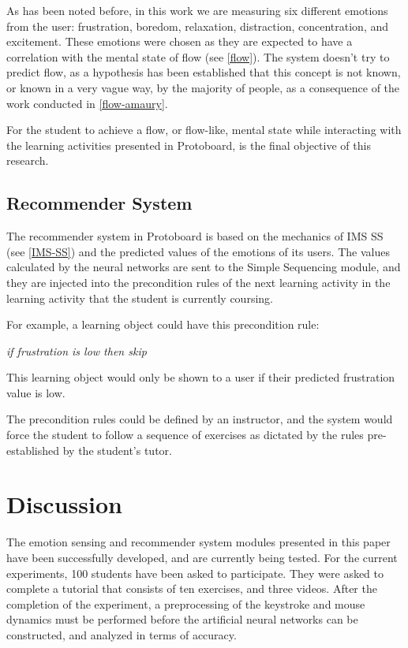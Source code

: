\documentclass{acm_proc_article-sp}
\begin{document}
As has been noted before, in this work we are measuring six different
emotions from the user: frustration, boredom, relaxation, distraction,
concentration, and excitement. These emotions were chosen as they are
expected to have a correlation with the mental state of flow (see
\ref{flow}). The system doesn't try to predict flow, as a hypothesis
has been established that this concept is not known, or known in a
very vague way, by the majority of people, as a consequence of the
work conducted in \ref{flow-amaury}.

For the student to achieve a flow, or flow-like, mental state while
interacting with the learning activities presented in Protoboard, is
the final objective of this research.


\subsection{Recommender System}

The recommender system in Protoboard is based on the mechanics of IMS
SS (see \ref{IMS-SS}) and the predicted values of the emotions of its
users. The values calculated by the neural networks are sent to the
Simple Sequencing module, and they are injected into the precondition
rules of the next learning activity in the learning activity that the student is
currently coursing.

For example, a learning object could have this precondition rule:

\textit{if frustration is low then skip}

This learning object would only be shown to a user if their predicted
frustration value is low.

The precondition rules could be defined by an instructor, and the
system would force the student to follow a sequence of exercises as
dictated by the rules pre-established by the student's tutor.


\section{Discussion}
\label{discussion}

The emotion sensing and recommender system modules presented in this
paper have been successfully developed, and are currently being
tested. For the current experiments, 100 students have been asked to
participate. They were asked to complete a tutorial that consists of
ten exercises, and three videos. After the completion of the
experiment, a preprocessing of the keystroke and mouse dynamics must
be performed before the artificial neural networks can be constructed,
and analyzed in terms of accuracy.
\end{document}
